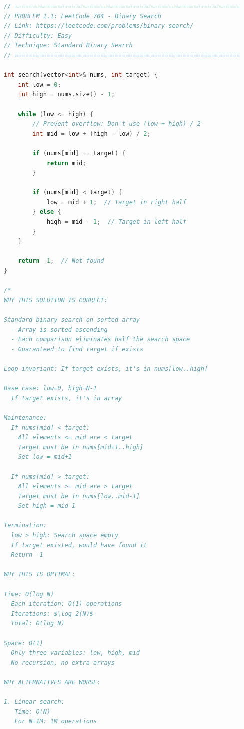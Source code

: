 \documentclass[11pt,a4paper,oneside]{book}
\begin{document}
\begin{lstlisting}[language=C++, caption=Complete Basic Binary Search Solutions]
// ===============================================================
// PROBLEM 1.1: LeetCode 704 - Binary Search
// Link: https://leetcode.com/problems/binary-search/
// Difficulty: Easy
// Technique: Standard Binary Search
// ===============================================================

int search(vector<int>& nums, int target) {
    int low = 0;
    int high = nums.size() - 1;
    
    while (low <= high) {
        // Prevent overflow: Don't use (low + high) / 2
        int mid = low + (high - low) / 2;
        
        if (nums[mid] == target) {
            return mid;
        }
        
        if (nums[mid] < target) {
            low = mid + 1;  // Target in right half
        } else {
            high = mid - 1;  // Target in left half
        }
    }
    
    return -1;  // Not found
}

/*
WHY THIS SOLUTION IS CORRECT:

Standard binary search on sorted array
  - Array is sorted ascending
  - Each comparison eliminates half the search space
  - Guaranteed to find target if exists

Loop invariant: If target exists, it's in nums[low..high]

Base case: low=0, high=N-1
  If target exists, it's in array 

Maintenance:
  If nums[mid] < target:
    All elements <= mid are < target
    Target must be in nums[mid+1..high]
    Set low = mid+1 
  
  If nums[mid] > target:
    All elements >= mid are > target
    Target must be in nums[low..mid-1]
    Set high = mid-1 

Termination:
  low > high: Search space empty
  If target existed, would have found it
  Return -1 

WHY THIS IS OPTIMAL:

Time: O(log N)
  Each iteration: O(1) operations
  Iterations: $\log_2(N)$
  Total: O(log N)

Space: O(1)
  Only three variables: low, high, mid
  No recursion, no extra arrays

WHY ALTERNATIVES ARE WORSE:

1. Linear search:
   Time: O(N)
   For N=1M: 1M operations
   

\end{lstlisting}
\end{document}
